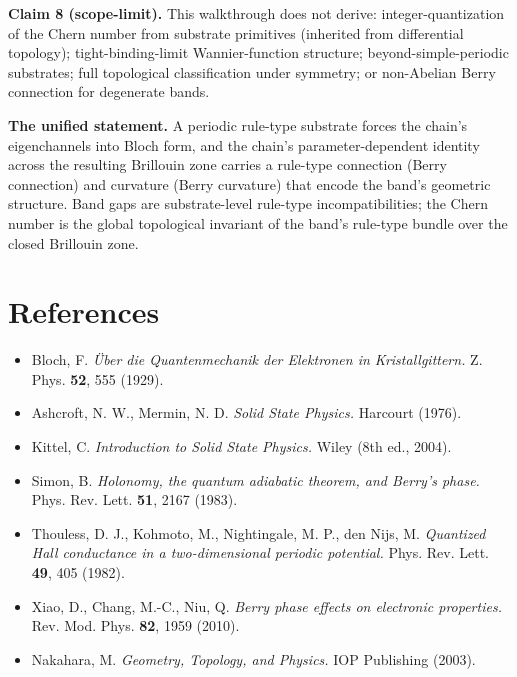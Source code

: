 \documentclass[11pt,a4paper]{article}
\begin{document}
\textbf{Claim 8 (scope-limit).} This walkthrough does not derive: integer-quantization of the Chern number from substrate primitives (inherited from differential topology); tight-binding-limit Wannier-function structure; beyond-simple-periodic substrates; full topological classification under symmetry; or non-Abelian Berry connection for degenerate bands.

\textbf{The unified statement.} A periodic rule-type substrate forces the chain's eigenchannels into Bloch form, and the chain's parameter-dependent identity across the resulting Brillouin zone carries a rule-type connection (Berry connection) and curvature (Berry curvature) that encode the band's geometric structure. Band gaps are substrate-level rule-type incompatibilities; the Chern number is the global topological invariant of the band's rule-type bundle over the closed Brillouin zone.

\section*{References}

\begin{itemize}[leftmargin=*,itemsep=2pt]
  \item Bloch, F. \emph{\"Uber die Quantenmechanik der Elektronen in Kristallgittern.} Z. Phys. \textbf{52}, 555 (1929).
  \item Ashcroft, N. W., Mermin, N. D. \emph{Solid State Physics.} Harcourt (1976).
  \item Kittel, C. \emph{Introduction to Solid State Physics.} Wiley (8th ed., 2004).
  \item Simon, B. \emph{Holonomy, the quantum adiabatic theorem, and Berry's phase.} Phys. Rev. Lett. \textbf{51}, 2167 (1983).
  \item Thouless, D. J., Kohmoto, M., Nightingale, M. P., den Nijs, M. \emph{Quantized Hall conductance in a two-dimensional periodic potential.} Phys. Rev. Lett. \textbf{49}, 405 (1982).
  \item Xiao, D., Chang, M.-C., Niu, Q. \emph{Berry phase effects on electronic properties.} Rev. Mod. Phys. \textbf{82}, 1959 (2010).
  \item Nakahara, M. \emph{Geometry, Topology, and Physics.} IOP Publishing (2003).
\end{itemize}
\end{document}
